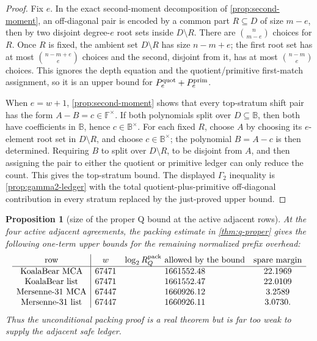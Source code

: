 \documentclass[a4paper,11pt]{amsart}
\newtheorem{proposition}[theorem]{Proposition}
\theoremstyle{remark}
\newcommand{\F}{\mathbb F}
\newcommand{\B}{\mathbb B}
\begin{document}
\begin{proof}
Fix \(e\).  In the exact second-moment decomposition of \cref{prop:second-moment}, an off-diagonal pair is encoded by a common part \(R\subseteq D\) of size \(m-e\), then by two disjoint degree-\(e\) root sets inside \(D\setminus R\).  There are \(\binom n{m-e}\) choices for \(R\).  Once \(R\) is fixed, the ambient set \(D\setminus R\) has size \(n-m+e\); the first root set has at most \(\binom{n-m+e}{e}\) choices and the second, disjoint from it, has at most \(\binom{n-m}{e}\) choices.  This ignores the depth equation and the quotient/primitive first-match assignment, so it is an upper bound for \(P_e^{\rm quot}+P_e^{\rm prim}\).

When \(e=w+1\), \cref{prop:second-moment} shows that every top-stratum shift pair has the form \(A-B=c\in\F^\times\).  If both polynomials split over \(D\subseteq\B\), then both have coefficients in \(\B\), hence \(c\in\B^\times\).  For each fixed \(R\), choose \(A\) by choosing its \(e\)-element root set in \(D\setminus R\), and choose \(c\in\B^\times\); the polynomial \(B=A-c\) is then determined.  Requiring \(B\) to split over \(D\setminus R\), to be disjoint from \(A\), and then assigning the pair to either the quotient or primitive ledger can only reduce the count.  This gives the top-stratum bound.  The displayed \(\Gamma_2\) inequality is \cref{prop:gamma2-ledger} with the total quotient-plus-primitive off-diagonal contribution in every stratum replaced by the just-proved upper bound.
\end{proof}

\begin{proposition}[size of the proper Q bound at the active adjacent rows]\label{prop:proper-q-gap}
At the four active adjacent agreements, the packing estimate in \cref{thm:q-proper} gives the following one-term upper bounds for the remaining normalized prefix overhead:
\[
\begin{array}{c|ccc}
\text{row} & w & \log_2 R_Q^{\rm pack}\text{ allowed by the bound} & \text{spare margin}\\
\hline
\text{KoalaBear MCA} & 67471 & 1661552.48 & 22.1969\\
\text{KoalaBear list} & 67471 & 1661552.47 & 22.0109\\
\text{Mersenne-31 MCA} & 67447 & 1660926.12 & 3.2589\\
\text{Mersenne-31 list} & 67447 & 1660926.11 & 3.0730 .
\end{array}
\]
Thus the unconditional packing proof is a real theorem but is far too weak to supply the adjacent safe ledger.
\end{proposition}
\end{document}
